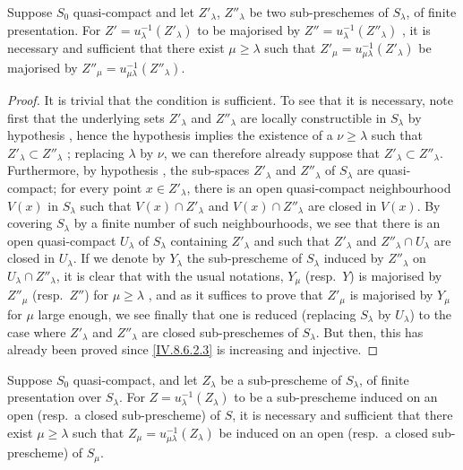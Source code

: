 \begin{corollary}[8.6.3.1]
\label{IV.8.6.3.1}
Suppose $S_0$ quasi-compact and let $Z'_\lambda$, $Z''_\lambda$ be two sub-preschemes of $S_\lambda$, of finite presentation.
For $Z'=u_\lambda^{-1}(Z'_\lambda)$ to be majorised by $Z''=u_\lambda^{-1}(Z''_\lambda)$ , it is necessary and sufficient that there exist $\mu\geqslant\lambda$ such that $Z'_\mu=u_{\mu\lambda}^{-1}(Z'_\lambda)$ be majorised by $Z''_\mu=u_{\mu\lambda}^{-1}(Z''_\lambda)$.
\end{corollary}

\begin{proof}
It is trivial that the condition is sufficient.
To see that it is necessary, note first that the underlying sets $Z'_\lambda$ and $Z''_\lambda$ are locally constructible in $S_\lambda$ by hypothesis , hence the hypothesis implies the existence of a $\nu\geqslant\lambda$ such that $Z'_\lambda\subset Z''_\lambda$ ; replacing $\lambda$ by $\nu$, we can therefore already suppose that $Z'_\lambda\subset Z''_\lambda$.
Furthermore, by hypothesis , the sub-spaces $Z'_\lambda$ and $Z''_\lambda$ of $S_\lambda$ are quasi-compact; for every point $x\in Z'_\lambda$, there is an open quasi-compact neighbourhood $V(x)$ in $S_\lambda$ such that $V(x)\cap Z'_\lambda$ and $V(x)\cap Z''_\lambda$ are closed in $V(x)$.
By covering $S_\lambda$ by a finite number of such neighbourhoods, we see that there is an open quasi-compact $U_\lambda$ of $S_\lambda$ containing $Z'_\lambda$ and such that $Z'_\lambda$ and $Z''_\lambda\cap U_\lambda$ are closed in $U_\lambda$.
If we denote by $Y_\lambda$ the sub-prescheme of $S_\lambda$ induced by $Z''_\lambda$ on $U_\lambda\cap Z''_\lambda$, it is clear that with the usual notations, $Y_\mu$ (resp.\ $Y$) is majorised by $Z''_\mu$ (resp.\ $Z''$) for $\mu\geqslant\lambda$ , and as it suffices to prove that $Z'_\mu$ is majorised by $Y_\mu$ for $\mu$
large enough, we see finally that one is reduced (replacing $S_\lambda$ by $U_\lambda$) to the case where $Z'_\lambda$ and $Z''_\lambda$ are closed sub-preschemes of $S_\lambda$.
But then, this has already been proved since \eqref{IV.8.6.2.3} is increasing and injective.
\end{proof}

\begin{corollary}[8.6.4]
\label{IV.8.6.4}
Suppose $S_0$ quasi-compact, and let $Z_\lambda$ be a sub-prescheme of $S_\lambda$, of finite presentation over $S_\lambda$.
For $Z=u_\lambda^{-1}(Z_\lambda)$ to be a sub-prescheme induced on an open (resp.\ a closed sub-prescheme) of $S$, it is necessary and sufficient that there exist $\mu\geqslant\lambda$ such that $Z_\mu=u_{\mu\lambda}^{-1}(Z_\lambda)$ be induced on an open (resp.\ a closed sub-prescheme) of $S_\mu$.
\end{corollary}

